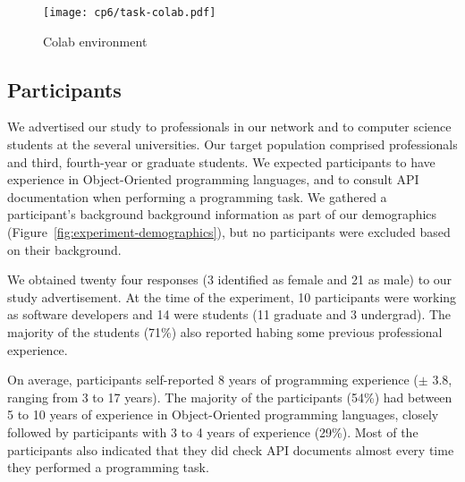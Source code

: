 \begin{figure}
    \centering
    \texttt{[image: cp6/task-colab.pdf]}
    \caption{Colab environment}
    \label{fig:nytimes-task-colab}
\end{figure}



\clearpage



\subsection{Participants}
\label{cp6:participants}


We advertised our study to professionals in our network and to computer science students at the several universities. 
Our target population comprised professionals and third, fourth-year or graduate students.
We expected participants to have experience in Object-Oriented programming languages, and to consult API documentation when performing a programming task.
We gathered a participant's background background information as part of our demographics (Figure~\ref{fig:experiment-demographics}), but no participants were excluded
based on their background.







We obtained twenty four responses (3 identified as female and 21 as male) to our study advertisement. 
At the time of the experiment, 10 participants were working as software
developers and 14 were students (11 graduate and 3 undergrad).
The majority of the students (71\%) also reported habing some previous professional experience.


On average, participants self-reported 8 years of programming experience ({\small $\pm$} 3.8, ranging from 3 to 17 years).
The majority of the participants (54\%) had between 5 to 10 years of experience in Object-Oriented programming languages,
closely followed by participants  with  3 to 4 years of experience (29\%). 
Most of the participants also indicated that they did check API documents almost every time they performed a programming task. 



